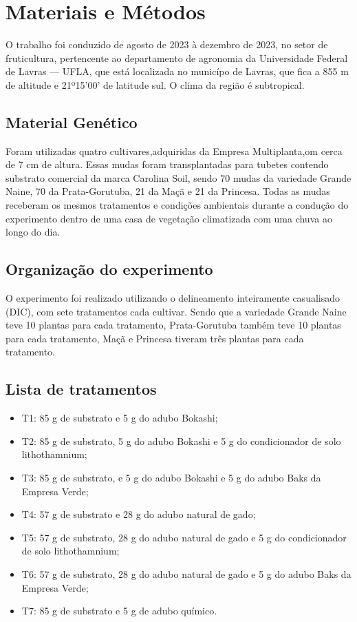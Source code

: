 \chapter{Materiais e Métodos}

O trabalho foi conduzido de agosto de 2023 à dezembro de 2023, no setor de fruticultura, pertencente ao departamento de agronomia da Universidade Federal de Lavras --- UFLA, que está localizada no municípo de Lavras, que fica a 855 \unit{\metre} de altitude e 21º15'00' de latitude sul. O clima da região é subtropical.

\section{Material Genético}
Foram utilizadas quatro cultivares,adquiridas da Empresa Multiplanta,om cerca de 7 \unit{\centi\metre} de altura. Essas mudas foram transplantadas  para tubetes contendo substrato comercial da marca Carolina Soil, sendo 70 mudas da variedade Grande Naine, 70 da Prata-Gorutuba, 21 da Maçã e 21 da Princesa. Todas as mudas receberam os mesmos tratamentos e condições ambientais durante a condução do experimento dentro de uma casa de vegetação climatizada com uma chuva ao longo do dia.

\section{Organização do experimento}
O experimento foi realizado utilizando o delineamento inteiramente casualisado (DIC), com sete tratamentos cada cultivar. Sendo que a variedade Grande Naine teve 10 plantas para cada tratamento, Prata-Gorutuba também teve 10 plantas para cada tratamento, Maçã e Princesa tiveram três plantas para cada tratamento.

\section{Lista de tratamentos}

\begin{itemize}
	\item T1: 85 \unit{\gram} de substrato e 5 \unit{\gram} do adubo Bokashi;
	\item T2: 85 \unit{\gram} de substrato, 5 \unit{\gram} do adubo Bokashi e 5 \unit{\gram} do condicionador de solo lithothamnium;
	\item T3: 85 \unit{\gram} de substrato, e 5 \unit{\gram} do adubo Bokashi e 5 \unit{\gram} do adubo Baks da Empresa Verde;
	\item T4: 57 \unit{\gram} de substrato e 28 \unit{\gram} do adubo natural de gado;
	\item T5: 57 \unit{\gram} de substrato, 28 \unit{\gram} do adubo natural de gado e 5 \unit{\gram} do condicionador de solo lithothamnium;
	\item T6: 57 \unit{\gram} de substrato, 28 \unit{\gram} do adubo natural de gado e 5 \unit{\gram} do adubo Baks da Empresa Verde;
	\item T7: 85 \unit{\gram} de substrato e 5 \unit{\gram} de adubo químico.
\end{itemize}

